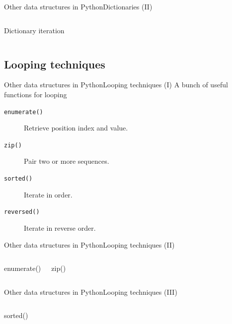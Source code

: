 \documentclass[10pt,compress]{beamer} %
\begin{document}
{\begin{frame}{Other data structures in Python}{Dictionaries (II)}
    \begin{columns}
		\begin{block}{Dictionary iteration}
		\vspace{-0.2cm}
		
		\vspace{-0.2cm}
		\end{block}
	\end{columns}
\end{frame}

\subsection{Looping techniques}
\begin{frame}{Other data structures in Python}{Looping techniques (I)}
	A bunch of useful functions for looping
		\begin{description}
		\item[\texttt{enumerate()}] Retrieve position index and value.
		\item[\texttt{zip()}] Pair two or more sequences.
		\item[\texttt{sorted()}] Iterate in order.
		\item[\texttt{reversed()}] Iterate in reverse order.
		\end{description}
\end{frame}

\begin{frame}{Other data structures in Python}{Looping techniques (II)}
    \begin{columns}
 	   \column{\textwidth}
		\begin{block}{enumerate()}
		\vspace{-0.2cm}
		
		\vspace{-0.2cm}
		\end{block}

		\begin{block}{zip()}
		\vspace{-0.2cm}
		
		\vspace{-0.2cm}
		\end{block}

	\end{columns}
\end{frame}

\begin{frame}{Other data structures in Python}{Looping techniques (III)}
    \begin{columns}
 	   \column{\textwidth}
		\begin{block}{sorted()}
		\vspace{-0.2cm}
		
		\vspace{-0.2cm}
		\end{block}


\end{columns}
\end{frame}}
\end{document}
